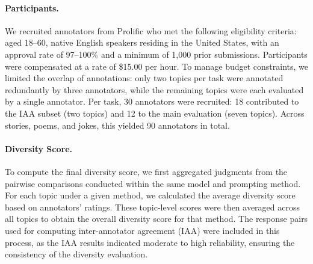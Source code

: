 \paragraph{Participants.} 
We recruited annotators from Prolific who met the following eligibility criteria: aged 18–60, native English speakers residing in the United States, with an approval rate of 97–100\% and a minimum of 1,000 prior submissions. Participants were compensated at a rate of \$15.00 per hour. 
To manage budget constraints, we limited the overlap of annotations: only two topics per task were annotated redundantly by three annotators, while the remaining topics were each evaluated by a single annotator.
Per task, 30 annotators were recruited: 18 contributed to the IAA subset (two topics) and 12 to the main evaluation (seven topics). Across stories, poems, and jokes, this yielded 90 annotators in total.

\paragraph{Diversity Score.}
To compute the final diversity score, we first aggregated judgments from the pairwise comparisons conducted within the same model and prompting method. For each topic under a given method, we calculated the average diversity score based on annotators' ratings. These topic-level scores were then averaged across all topics to obtain the overall diversity score for that method. The response pairs used for computing inter-annotator agreement (IAA) were included in this process,
as the IAA results indicated moderate to high reliability, ensuring the consistency of the diversity evaluation.


